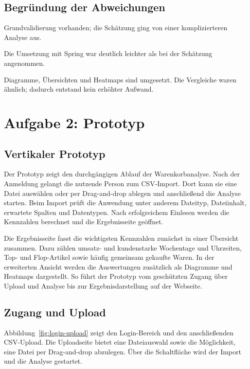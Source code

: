 \documentclass[a4paper,10pt]{article}
\begin{document}
\subsection*{Begründung der Abweichungen}
\begin{description}[leftmargin=2.1cm,style=nextline]
    \item[AP 4 -- CSV-Import] Grundvalidierung vorhanden; die Schätzung ging von einer komplizierteren Analyse aus.
    \item[AP 5 -- Web / Passwort] Die Umsetzung mit Spring war deutlich leichter als bei der Schätzung angenommen.
    \item[AP 10 -- Grafische Ausgaben] Diagramme, Übersichten und Heatmaps sind umgesetzt. Die Vergleiche waren ähnlich; dadurch entstand kein erhöhter Aufwand.
\end{description}

\section*{Aufgabe 2: Prototyp}
\subsection*{Vertikaler Prototyp}
Der Prototyp zeigt den durchgängigen Ablauf der Warenkorbanalyse. Nach der Anmeldung gelangt die nutzende Person zum CSV-Import. Dort kann sie eine Datei auswählen oder per Drag-and-drop ablegen und anschließend die Analyse starten. Beim Import prüft die Anwendung unter anderem Dateityp, Dateiinhalt, erwartete Spalten und Datentypen. Nach erfolgreichem Einlesen werden die Kennzahlen berechnet und die Ergebnisseite geöffnet.

Die Ergebnisseite fasst die wichtigsten Kennzahlen zunächst in einer Übersicht zusammen. Dazu zählen umsatz- und kundenstarke Wochentage und Uhrzeiten, Top- und Flop-Artikel sowie häufig gemeinsam gekaufte Waren. In der erweiterten Ansicht werden die Auswertungen zusätzlich als Diagramme und Heatmaps dargestellt. So führt der Prototyp vom geschützten Zugang über Upload und Analyse bis zur Ergebnisdarstellung auf der Webseite.

\subsection*{Zugang und Upload}
Abbildung~\ref{fig:login-upload} zeigt den Login-Bereich und den anschließenden CSV-Upload. Die Uploadseite bietet eine Dateiauswahl sowie die Möglichkeit, eine Datei per Drag-and-drop abzulegen. Über die Schaltfläche wird der Import und die Analyse gestartet.
\end{document}
